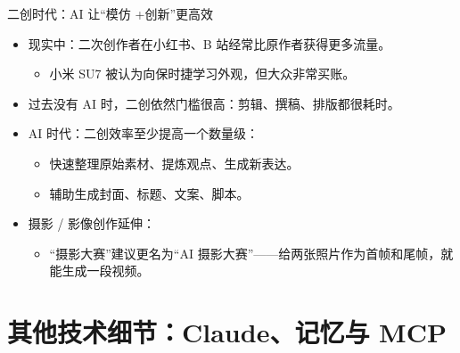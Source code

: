 \documentclass[aspectratio=169]{beamer}
\begin{document}
\begin{frame}{二创时代：AI 让“模仿 +创新”更高效}
  \begin{itemize}
    \item 现实中：二次创作者在小红书、B 站经常比原作者获得更多流量。
      \begin{itemize}
        \item 小米 SU7 被认为向保时捷学习外观，但大众非常买账。
      \end{itemize}
    \item 过去没有 AI 时，二创依然门槛很高：剪辑、撰稿、排版都很耗时。
    \item AI 时代：二创效率至少提高一个数量级：
      \begin{itemize}
        \item 快速整理原始素材、提炼观点、生成新表达。
        \item 辅助生成封面、标题、文案、脚本。
      \end{itemize}
    \item 摄影 / 影像创作延伸：
      \begin{itemize}
        \item “摄影大赛”建议更名为“AI 摄影大赛”——给两张照片作为首帧和尾帧，就能生成一段视频。
      \end{itemize}
  \end{itemize}
\end{frame}

\section{其他技术细节：Claude、记忆与 MCP}
\end{document}
